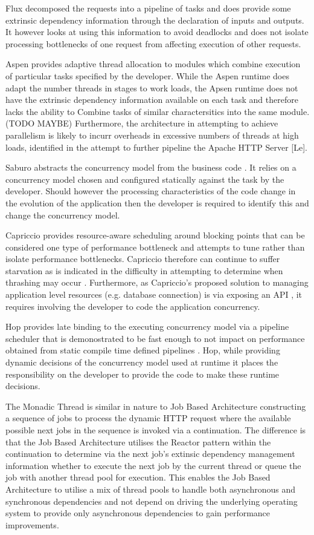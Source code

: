 \documentclass[conference]{ieee/IEEEtran}
\begin{document}
Flux \cite{flux} decomposed the requests into a pipeline of tasks and does
provide some extrinsic dependency information through the declaration of inputs and
outputs.  It however looks at using this information to avoid deadlocks and
does not isolate processing bottlenecks of one request from affecting execution
of other requests.
   
Aspen \cite{aspen} provides adaptive thread allocation to modules which combine
execution of particular tasks specified by the developer.  While the Aspen
runtime does adapt the number threads in stages to work loads, the Apsen runtime
does not have the extrinsic dependency information available on each task and
therefore lacks the ability to Combine tasks of similar charactersitics into the
same module.  (TODO MAYBE) Furthermore, the architecture in attempting to
achieve parallelism is likely to incurr overheads in excessive numbers of
threads at high loads, identified in the attempt to further pipeline the Apache
HTTP Server [Le].
   
Saburo abstracts the concurrency model from the business code \cite{saburo}.
It relies on a concurrency model chosen and configured statically against the
task by the developer.  Should however the processing characteristics of the
code change in the evolution of the application then the developer is required
to identify this and change the concurrency model.

Capriccio provides resource-aware scheduling around blocking points
\cite{capriccio} that can be considered one type of performance bottleneck and
attempts to tune rather than isolate performance bottlenecks.  Capriccio
therefore can continue to suffer starvation as is indicated in the difficulty in
attempting to determine when thrashing may occur \cite{capriccio}. Furthermore,
as Capriccio's proposed solution to managing application level resources (e.g.
database connection) is via exposing an API \cite{capriccio}, it requires
involving the developer to code the application concurrency.
   
Hop provides late binding to the executing concurrency model via a pipeline
scheduler that is demonostrated to be fast enough to not impact on performance
obtained from static compile time defined pipelines \cite{hop}.  Hop,
while providing dynamic decisions of the concurrency model used at runtime it places
the responsibility on the developer to provide the code to make these runtime
decisions.
   
The Monadic Thread \cite{monadic-thread} is similar in nature to Job Based Architecture
constructing a sequence of jobs to process the dynamic HTTP request where the
available possible next jobs in the sequence is invoked via a continuation. 
The difference is that the Job Based Architecture utilises the Reactor pattern
within the continuation to determine via the next job's extinsic dependency
management information whether to execute the next job by the current thread or
queue the job with another thread pool for execution.  This enables the Job
Based Architecture to utilise a mix of thread pools to handle both asynchronous
and synchronous dependencies and not depend on driving the underlying operating
system to provide only asynchronous dependencies to gain performance
improvements.
   
\end{document}
